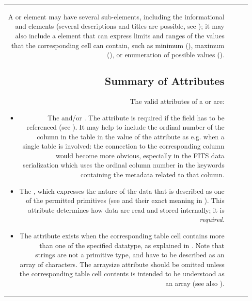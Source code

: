 \begin{tabular}{RRCp{0.8\textwidth}}
\begin{center}
A {} or  element may have several sub-elements, 
including the informational {}
and {} elements (several descriptions and titles
are possible, see ); 
it may also include a {} element
that can express limits and ranges of the values that the
corresponding cell can contain, such as minimum (), 
maximum (), or
enumeration of possible values (). 

\subsection{Summary of Attributes}
\label{elem:FIELD}
\label{elem:PARAM}
The valid attributes of a  or  are:

\begin{itemize}
\item   The  and/or . The  attribute is required
        if the field has to be referenced (see 
        ).
        It may help to include the ordinal number of 
        the column in the table in the value of the  attribute
        as e.g.  when a single table is involved: 
        the connection to the
        corresponding column would become
        more obvious, especially in the FITS data serialization
        which uses the ordinal column number in the keywords containing
        the metadata related to that column. 

\item   The , which expresses the nature of the data 
        that is described as one of the permitted primitives 
        (see  and their exact meaning 
        in ).
        This attribute determines
        how data are read and stored internally;
        it is {\em required}. 

\item   The  attribute exists when 
        the corresponding table cell contains more than one of the specified
        datatype, as explained in .
        Note that strings are not a primitive type,
        and have to be described as an array of characters.  The
        arraysize attribute should be omitted unless the corresponding
        table cell contents is intended to be understood as an array
        (see also ).


\end{itemize}
\end{center}
\end{tabular}
